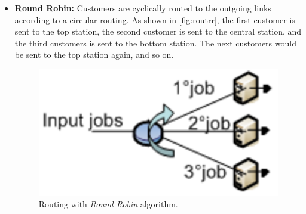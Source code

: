 \begin{itemize}
\item \textbf{Round Robin:} Customers are cyclically routed to the
outgoing links according to a circular routing. As shown in
\autoref{fig:routrr}, the first customer is sent to the top
station, the second customer is sent to the central station, and
the third customers is sent to the bottom station. The next
customers would be sent to the top station again, and so on.
\begin{figure}[htb]
    \begin{center}
        \includegraphics[scale=.5]{img/jsimg/8.8.eps}
    \end{center}
    \caption{Routing with \emph{Round Robin} algorithm.}
    \label{fig:routrr}
\end{figure}


\end{itemize}
